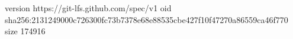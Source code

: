 version https://git-lfs.github.com/spec/v1
oid sha256:2131249000c726300fc73b7378e68e88535cbe427f10f47270a86559ca46f770
size 174916
